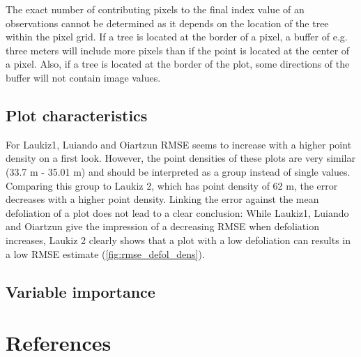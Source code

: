 \documentclass[review]{elsarticle}
\begin{document}
The exact number of contributing pixels to the final index value of an observations cannot be determined as it depends on the location of the tree within the pixel grid.
If a tree is located at the border of a pixel, a buffer of e.g. three meters will include more pixels than if the point is located at the center of a pixel.
Also, if a tree is located at the border of the plot, some directions of the buffer will not contain image values.

\subsection{Plot characteristics}

For Laukiz1, Luiando and Oiartzun \ac{RMSE} seems to increase with a higher point density on a first look.
However, the point densities of these plots are very similar (33.7 m - 35.01 m) and should be interpreted as a group instead of single values.
Comparing this group to Laukiz 2, which has point density of 62 m, the error decreases with a higher point density.
Linking the error against the mean defoliation of a plot does not lead to a clear conclusion:
While Laukiz1, Luiando and Oiartzun give the impression of a decreasing RMSE when defoliation increases, Laukiz 2 clearly shows that a plot with a low defoliation can results in a low RMSE estimate (\autoref{fig:rmse_defol_dens}).

\subsection{Variable importance}


\section*{References}


\end{document}
